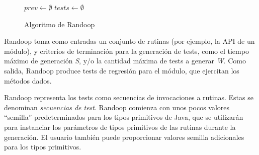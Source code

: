 \begin{figure}[H]
    \centering
    \begin{algorithm}[H]
        \SetAlgoLined
        
        $prev \leftarrow \emptyset$\;
        $tests \leftarrow \emptyset$\;
        
        \;
    \end{algorithm}
    \caption{Algoritmo de Randoop}
    \label{fig:randoop-algorithm}
\end{figure}


\textsf{Randoop} toma como entradas un conjunto de rutinas (por ejemplo, la API
de un módulo), y criterios de terminación para la generación de tests, como el tiempo
máximo de generación \emph{S}, y/o la cantidad máxima de tests a generar \emph{W}.
Como salida, \textsf{Randoop} produce tests de regresión para el módulo, que
ejercitan los métodos dados.

\textsf{Randoop} representa los tests como secuencias de invocaciones a 
rutinas. Estas se denominan \emph{secuencias de
test}. \textsf{Randoop} comienza con unos pocos valores ``semilla''
predeterminados para los tipos primitivos de Java, que se utilizarán para
instanciar los parámetros de tipos primitivos de las rutinas durante la
generación. El usuario también puede proporcionar valores semilla adicionales
para los tipos primitivos. 

